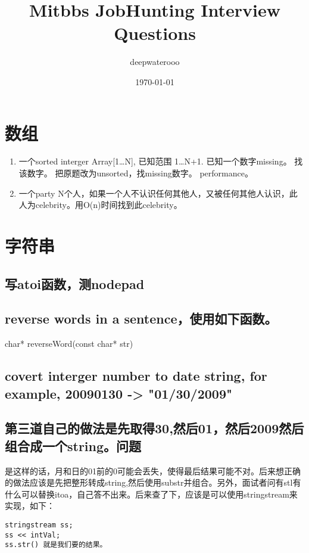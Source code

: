 \documentclass[12pt]{book}
\author{deepwaterooo}
\date{\today}
\title{Mitbbs JobHunting Interview Questions}
\begin{document}
\maketitle
\tableofcontents


\chapter{数组}
\label{sec-1}
\begin{enumerate}
\item 一个sorted interger Array[1\ldots{}N], 已知范围 1\ldots{}N+1. 已知一个数字missing。 找该数字。 把原题改为unsorted，找missing数字。 performance。

\item 一个party N个人，如果一个人不认识任何其他人，又被任何其他人认识，此人为celebrity。用O(n)时间找到此celebrity。
\end{enumerate}

\chapter{字符串}
\label{sec-2}
\section{写atoi函数，测nodepad}
\label{sec-2-1}

\section{reverse words in a sentence，使用如下函数。}
\label{sec-2-2}
char* reverseWord(const char* str)

\section{covert interger number to date string, for example, 20090130 -> "01/30/2009"}
\label{sec-2-3}

\section{第三道自己的做法是先取得30,然后01，然后2009然后组合成一个string。问题}
\label{sec-2-4}
是这样的话，月和日的01前的0可能会丢失，使得最后结果可能不对。后来想正确的做法应该是先把整形转成string,然后使用substr并组合。另外，面试者问有stl有什么可以替换itoa，自己答不出来。后来查了下，应该是可以使用stringstream来实现，如下：
\lstset{language=java,label= ,caption= ,numbers=none}
\begin{lstlisting}
stringstream ss;
ss << intVal;
ss.str() 就是我们要的结果。
\end{lstlisting}
\end{document}

